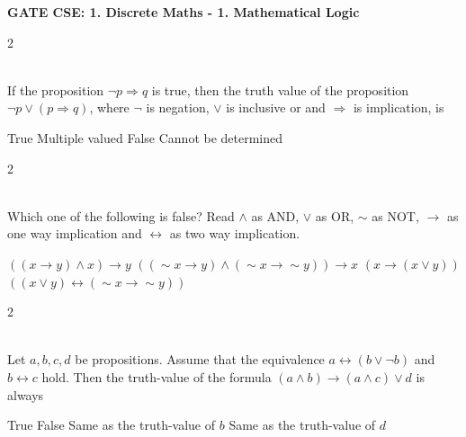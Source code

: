 \documentclass[12pt]{exam}
\begin{document}
\begin{center}
\LARGE \textbf{GATE CSE: 1. Discrete Maths - 1. Mathematical Logic}
\end{center}
\vspace{0.5cm}
\begin{questions}
\begin{multicols*}{2}

 \\[0.2cm]
{\Large If the proposition $\neg p \Rightarrow q$ is true, then the truth value of the proposition $\neg p \vee (p \Rightarrow q)$, where $\neg$ is negation, $\vee$ is inclusive or and $\Rightarrow$ is implication, is}
\begin{choices}
  \choice True
  \choice Multiple valued
  \choice False
  \choice Cannot be determined
\end{choices}

\end{multicols*}
\vspace{0.6cm}
\newpage
\begin{multicols*}{2}

 \\[0.2cm]
{\Large Which one of the following is false? Read $\wedge$ as AND, $\vee$ as OR, $\sim$ as NOT, $\rightarrow$ as one way implication and $\leftrightarrow$ as two way implication.}
\begin{choices}
  \choice $((x \rightarrow y) \wedge x) \rightarrow y$
  \choice $((\sim x \rightarrow y) \wedge (\sim x \rightarrow \sim y)) \rightarrow x$
  \choice $(x \rightarrow (x \vee y))$
  \choice $((x \vee y) \leftrightarrow (\sim x \rightarrow \sim y))$
\end{choices}

\end{multicols*}
\vspace{0.6cm}
\newpage
\begin{multicols*}{2}

 \\[0.2cm]
{\Large Let $a, b, c, d$ be propositions. Assume that the equivalence $a \leftrightarrow (b \vee \neg b)$ and $b \leftrightarrow c$ hold. Then the truth-value of the formula $(a \wedge b) \rightarrow (a \wedge c) \vee d$ is always}
\begin{choices}
  \choice True
  \choice False
  \choice Same as the truth-value of $b$
  \choice Same as the truth-value of $d$
\end{choices}


\end{multicols*}
\end{questions}
\end{document}
